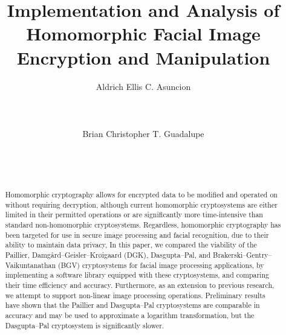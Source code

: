 \documentclass{sig-alternate-05-2015}
\begin{document}
\title{Implementation and Analysis of Homomorphic Facial Image Encryption and Manipulation}



\author{
\alignauthor Aldrich Ellis C. Asuncion\\
\\
\\
\\
\alignauthor Brian Christopher T. Guadalupe\\
\\
\\
\\
}

\maketitle

\begin{abstract}
Homomorphic cryptography allows for encrypted data to be modified and operated on without requiring decryption, although current homomorphic cryptosystems are either limited in their permitted operations or are significantly more time-intensive than standard non-homomorphic cryptosystems. Regardless, homomorphic cryptography has been targeted for use in secure image processing and facial recognition, due to their ability to maintain data privacy, In this paper, we compared the viability of the Paillier, Damg{\aa}rd--Geisler--Kr{\o}igaard (DGK), Dasgupta--Pal, and Brakerski--Gentry--Vaikuntanathan (BGV) cryptosystems for facial image processing applications, by implementing a software library equipped with these cryptosystems, and comparing their time efficiency and accuracy. Furthermore, as an extension to previous research, we attempt to support non-linear image processing operations. Preliminary results have shown that the Paillier and Dasgupta--Pal cryptosystems are comparable in accuracy and may be used to approximate a logarithm transformation, but the Dasgupta--Pal cryptosystem is significantly slower.
\end{abstract}
\end{document}

